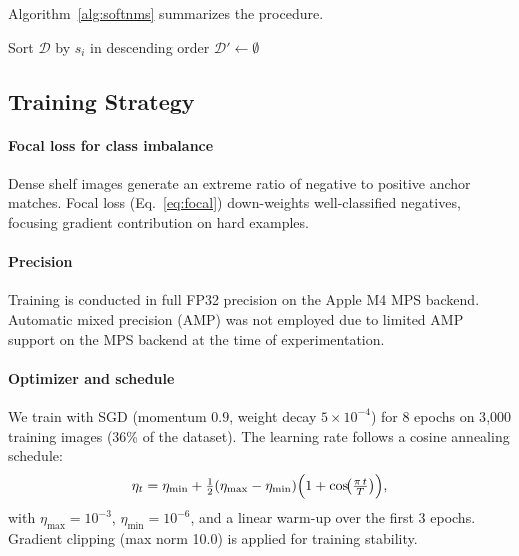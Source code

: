 \documentclass[conference]{IEEEtran}
\begin{document}
Algorithm~\ref{alg:softnms} summarizes the procedure.

\begin{algorithm}[t]
  \caption{Gaussian Soft-NMS}
  \label{alg:softnms}
  Sort $\mathcal{D}$ by $s_i$ in descending order\;
  $\mathcal{D}' \leftarrow \emptyset$\;
\end{algorithm}

\subsection{Training Strategy}
\label{sec:training}

\paragraph{Focal loss for class imbalance}
Dense shelf images generate an extreme ratio of negative to positive
anchor matches. Focal loss (Eq.~\ref{eq:focal}) down-weights
well-classified negatives, focusing gradient contribution on hard
examples.

\paragraph{Precision}
Training is conducted in full FP32 precision on the Apple M4 MPS backend.
Automatic mixed precision (AMP) was not employed due to limited AMP
support on the MPS backend at the time of experimentation.

\paragraph{Optimizer and schedule}
We train with SGD (momentum $0.9$, weight decay $5 \times 10^{-4}$)
for 8 epochs on 3{,}000 training images (36\% of the dataset). The learning
rate follows a cosine annealing schedule:
\begin{equation}
  \eta_t = \eta_{\min} + \tfrac{1}{2}(\eta_{\max} - \eta_{\min})
           \Bigl(1 + \cos\!\bigl(\tfrac{\pi\,t}{T}\bigr)\Bigr),
  \label{eq:cosine}
\end{equation}
with $\eta_{\max} = 10^{-3}$, $\eta_{\min} = 10^{-6}$, and a
linear warm-up over the first 3 epochs. Gradient clipping (max
norm 10.0) is applied for training stability.
\end{document}
